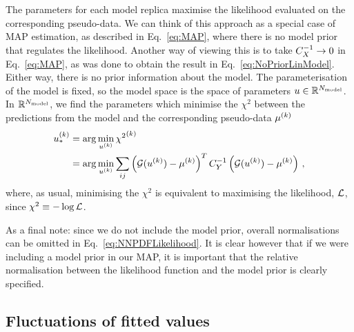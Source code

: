 The parameters for each model replica maximise the likelihood evaluated on the
corresponding pseudo-data. We can think of this approach as a special case of
MAP estimation, as described in Eq.~\ref{eq:MAP}, where there is no model
prior that regulates the likelihood. Another way of viewing this is to take
$C_X^{-1} \to 0$ in Eq.~\ref{eq:MAP}, as was done to obtain the
result in Eq.~\ref{eq:NoPriorLinModel}. Either way, there is no prior
information about the model. The parameterisation of the model is fixed, so the
model space is the space of parameters $u \in \mathbb{R}^{N_{\rm model}}$. In
$\mathbb{R}^{N_{\rm model}}$, we find the parameters which minimise the $\chi^2$ between
the predictions from the model and the corresponding pseudo-data
$\mu^{(k)}$
\begin{equation}\label{eq:NNPDFLikelihood}
    \begin{split}
        u_*^{(k)} &= \arg\min_{u^{(k)}} {\chi^2}^{(k)} \\
        &= \arg\min_{u^{(k)}} \sum_{ij}
        \left( \mathcal{G}(u^{(k)}) - \mu^{(k)} \right)^T
        C_{Y}^{-1}
        \left( \mathcal{G}(u^{(k)}) - \mu^{(k)} \right) \, ,
    \end{split}
\end{equation}
where, as usual, minimising the $\chi^2$ is equivalent to maximising the
likelihood, $\mathcal{L}$, since $\chi^2 \equiv -\log{\mathcal{L}}$.

As a final note: since we do not include the model prior, overall normalisations
can be omitted in Eq.~\ref{eq:NNPDFLikelihood}. It is clear however that if we
were including a model prior in our MAP, it is important that the relative
normalisation between the likelihood function and the model prior is clearly
specified.

\subsection{Fluctuations of fitted values}
\label{sec:fluct-fit-values}

